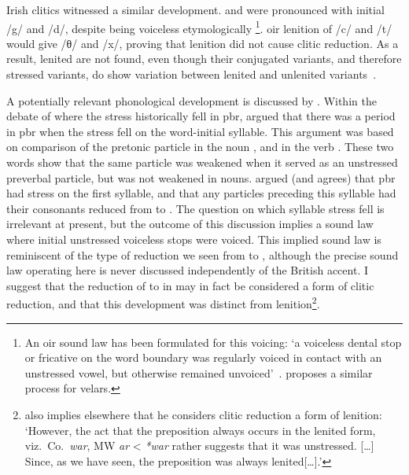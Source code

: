 Irish clitics witnessed a similar development.  
 and  were pronounced with initial /g/ and /d/, despite being voiceless etymologically%
\footnote{
  An \gls{oir} sound law has been formulated for this voicing: `a voiceless dental stop or fricative on the word boundary was regularly voiced in contact with an unstressed vowel, but otherwise remained unvoiced'~\autocite[42]{mccone_final_1981}. 
  \Textcite[43]{jongeleen_lenition_2016} proposes a similar process for velars.
}.
\Gls{oir} lenition of /c/ and /t/ would give /θ/ and /x/, proving that lenition did not cause clitic reduction.
As a result, lenited  are not found, even though their conjugated variants, and therefore stressed variants, do show variation between lenited and unlenited variants~\autocite[43]{jongeleen_lenition_2016}.

A potentially relevant phonological development is discussed by \textcite[16--17]{schrijver_studies_1995}.
Within the debate of where the stress historically fell in \gls{pbr},  \textcite{thurneysen_zur_1883} argued that there was a period in \gls{pbr} when the stress fell on the word-initial syllable.
This argument was based on comparison of the pretonic particle  in the noun , and in the verb .
These two words show that the same particle was weakened when it served as an unstressed preverbal particle, but was not weakened in nouns.
\Textcite{thurneysen_zur_1883} argued (and \textcite{schrijver_studies_1995} agrees) that \gls{pbr} had stress on the first syllable, and that any particles preceding this syllable had their consonants  reduced from  to .
The question on which syllable stress fell is irrelevant at present, but the outcome of this discussion implies a  sound law where initial unstressed voiceless stops were voiced.
This implied sound law is reminiscent of the type of reduction we seen from  to , although the precise sound law operating here is never discussed independently of the British accent.
I suggest that the reduction of  to  in  may in fact be considered a form of clitic reduction, and that this development was distinct from lenition\footnote{%
  \Textcite[125]{schrijver_studies_1995} also implies elsewhere that he considers clitic reduction a form of lenition: `However, the act that the preposition always occurs in the lenited form, viz.\ Co.\ \textit{war}, MW \textit{ar} < \textit{*war} rather suggests that it was unstressed. [\dots] Since, as we have seen, the preposition was always lenited[\dots].'}.


